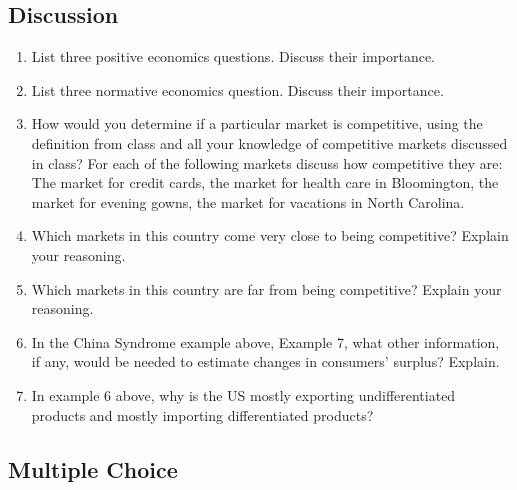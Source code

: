 \documentclass[
]{book}
\providecommand{\tightlist}{%
  \setlength{\itemsep}{0pt}\setlength{\parskip}{0pt}}
\begin{document}
\hypertarget{discussion-5}{%
\subsection{Discussion}\label{discussion-5}}

\begin{enumerate}
\def\labelenumi{\arabic{enumi}.}
\tightlist
\item
  List three positive economics questions. Discuss their importance.
\item
  List three normative economics question. Discuss their importance.
\item
  How would you determine if a particular market is competitive, using the definition from class and all your knowledge of competitive markets discussed in class? For each of the following markets discuss how competitive they are: The market for credit cards, the market for health care in Bloomington, the market for evening gowns, the market for vacations in North Carolina.
\item
  Which markets in this country come very close to being competitive? Explain your reasoning.
\item
  Which markets in this country are far from being competitive? Explain your reasoning.
\item
  In the China Syndrome example above, Example 7, what other information, if any, would be needed to estimate changes in consumers' surplus? Explain.
\item
  In example 6 above, why is the US mostly exporting undifferentiated products and mostly importing differentiated products?
\end{enumerate}

\hypertarget{multiple-choice-5}{%
\subsection{Multiple Choice}\label{multiple-choice-5}}
\end{document}
